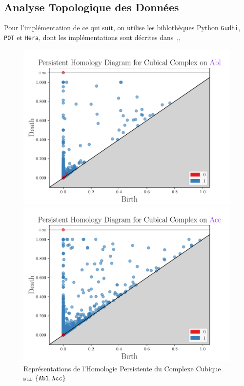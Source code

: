 \documentclass{cours}
\begin{document}
\subsection{Analyse Topologique des Données}
    Pour l'implémentation de ce qui suit, on utilise les biblothèques Python \texttt{Gudhi}, \texttt{POT} et \texttt{Hera}, dont les implémentations sont décrites dans~\cite{Gudhi},\cite{PythonPOT},~\cite{Hera}
    \begin{figure}[H]
        \begin{minipage}{.5\textwidth}
            \begin{center}
                \includegraphics[width=\linewidth]{Figures/Visualisations/cc_Abl}
            \end{center}
        \end{minipage}
        \begin{minipage}{.5\textwidth}
            \begin{center}
                \includegraphics[width=\linewidth]{Figures/Visualisations/cc_Acc}
            \end{center}
        \end{minipage}
        \caption{Représentations de l'Homologie Persistente du Complexe Cubique sur $\{\tt Abl,Acc\}$}
    \end{figure}
\end{document}
